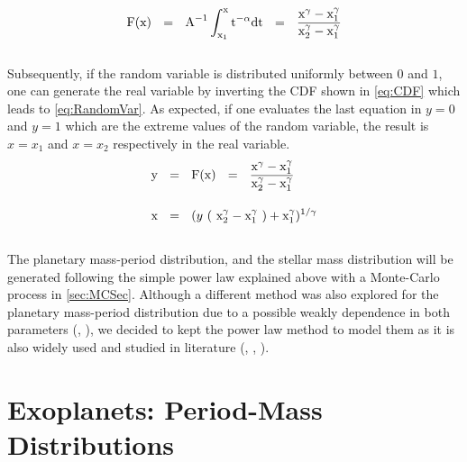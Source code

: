 \begingroup
\Large
\begin{equation}
 \textnormal{F}(\textnormal{x})~~=~~\textnormal{A}^{-1} \int_{\textnormal{x}_1}^{\textnormal{x}} \textnormal{t}^{-\alpha} \textnormal{dt}~~=~~\frac{\textnormal{x}^{\gamma} - \textnormal{x}_1^{\gamma}}{\textnormal{x}_2^{\gamma} - \textnormal{x}_1^{\gamma}}
 \label{eq:CDF}
\end{equation}
\endgroup\\

Subsequently, if the random variable is distributed uniformly between $0$ and $1$, one can generate the real variable by inverting the CDF shown in \autoref{eq:CDF} which leads to \autoref{eq:RandomVar}. As expected, if one evaluates the last equation in $y = 0$ and $y = 1$ which are the extreme values of the random variable, the result is $x = x_1$ and $x = x_2$ respectively in the real variable.\\

\begingroup
\Large
\begin{equation}
  \begin{align*}
    \textnormal{y} & ~~=~~  \textnormal{F}(\textnormal{x}) ~~=~~ \frac{\textnormal{x}^{\gamma} - \textnormal{x}_1^{\gamma}}{\textnormal{x}_2^{\gamma} - \textnormal{x}_1^{\gamma}} \\[10pt]
    \textnormal{x} & ~~=~~  (y~ (~\textnormal{x}_2^{\gamma} - \textnormal{x}_1^{\gamma}~) + \textnormal{x}_1^{\gamma})^{1/\gamma}
    \label{eq:RandomVar}
  \end{align*}
\end{equation}
\endgroup\\

The planetary mass-period distribution, and the stellar mass distribution will be generated following the simple power law explained above with a Monte-Carlo process in \autoref{sec:MCSec}. Although a different method was also explored for the planetary mass-period distribution due to a possible weakly dependence in both parameters (\citeyear{1538-3881-134-5-2061}, \citeyear{2002ApJ...568L.113Z}), we decided to kept the power law method to model them as it is also widely used and studied in literature (\citeyear{2010EAS....41..107N}, \citeyear{2008PASP..120..531C}, \citeyear{2006ApJ...646..505B}).  

\section{Exoplanets: Period-Mass Distributions}

